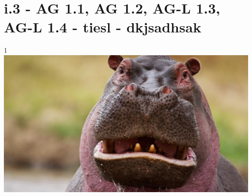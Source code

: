 \section{i.3 - AG 1.1, AG 1.2, AG-L 1.3, AG-L 1.4 - tiesl - dkjsadhsak}

\begin{langesbeispiel} \item[1] %
\includegraphics{../_database_inoffiziell/Bilder/1003_hippo.eps}


\end{langesbeispiel}